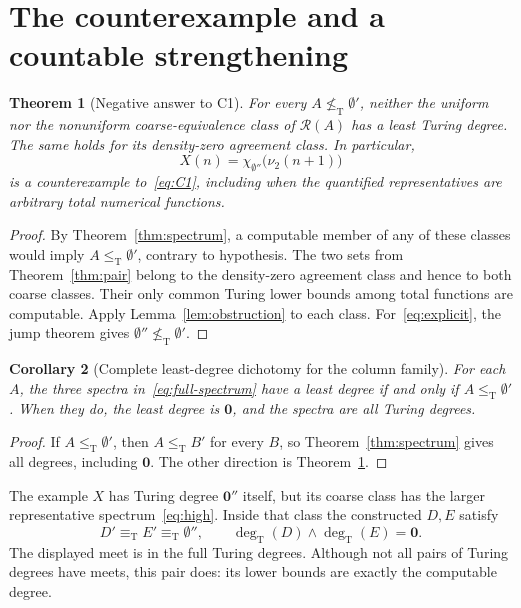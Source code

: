 \documentclass[11pt,a4paper]{article}
\newcommand{\leT}{\leq_{\mathrm T}}
\newcommand{\eqT}{\equiv_{\mathrm T}}
\newcommand{\nleT}{\nleq_{\mathrm T}}
\newcommand{\degT}{\operatorname{deg}_{\mathrm T}}
\newcommand{\R}{\mathcal R}
\newcommand{\zero}{\mathbf 0}
\newtheorem{theorem}{Theorem}[section]
\newtheorem{corollary}[theorem]{Corollary}
\theoremstyle{definition}\newtheorem{definition}[theorem]{Definition}
\theoremstyle{remark}\newtheorem{remark}[theorem]{Remark}
\begin{document}
\section{The counterexample and a countable strengthening}
\label{sec:counterexample}
\begin{theorem}[Negative answer to C1]\label{thm:C1}
For every $A\nleT\emptyset'$, neither the uniform nor the nonuniform coarse-equivalence class of $\R(A)$ has a least Turing degree. The same holds for its density-zero agreement class. In particular,
\begin{equation}
 \boxed{X(n)=\chi_{\emptyset''}\bigl(\nu_2(n+1)\bigr)}
 \label{eq:explicit}
\end{equation}
is a counterexample to~\eqref{eq:C1}, including when the quantified representatives are arbitrary total numerical functions.
\end{theorem}
\begin{proof}
By Theorem~\ref{thm:spectrum}, a computable member of any of these classes would imply $A\leT\emptyset'$, contrary to hypothesis. The two sets from Theorem~\ref{thm:pair} belong to the density-zero agreement class and hence to both coarse classes. Their only common Turing lower bounds among total functions are computable. Apply Lemma~\ref{lem:obstruction} to each class. For~\eqref{eq:explicit}, the jump theorem gives $\emptyset''\nleT\emptyset'$.
\end{proof}

\begin{corollary}[Complete least-degree dichotomy for the column family]\label{cor:dichotomy}
For each $A$, the three spectra in~\eqref{eq:full-spectrum} have a least degree if and only if $A\leT\emptyset'$. When they do, the least degree is $\zero$, and the spectra are all Turing degrees.
\end{corollary}
\begin{proof}
If $A\leT\emptyset'$, then $A\leT B'$ for every $B$, so Theorem~\ref{thm:spectrum} gives all degrees, including $\zero$. The other direction is Theorem~\ref{thm:C1}.
\end{proof}

The example $X$ has Turing degree $\zero''$ itself, but its coarse class has the larger representative spectrum~\eqref{eq:high}. Inside that class the constructed $D,E$ satisfy
\[
 D'\eqT E'\eqT\emptyset'',\qquad
 \degT(D)\wedge\degT(E)=\zero.
\]
The displayed meet is in the full Turing degrees. Although not all pairs of Turing degrees have meets, this pair does: its lower bounds are exactly the computable degree.
\end{document}
